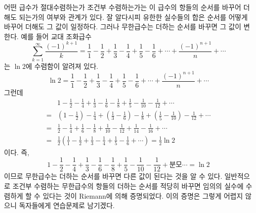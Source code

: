 \documentclass[11pt, a4paper]{book}
\begin{document}
 어떤 급수가 절대수렴하는가 조건부 수렴하는가는 이 급수의 항들의 순서를 바꾸어 더해도 되는가의 여부와 관계가 있다. 잘 알다시피 유한한 실수들의 합은 순서를 어떻게 바꾸어 더해도 그 값이 일정하다. 그러나 무한급수는 더하는 순서를 바꾸면 그 값이 변한다. 예를 들어 교대 조화급수
 \begin{equation*}
 	\sum_{k=1}^{\infty} \frac{(-1)^{k+1}}{k}=\frac{1}{1}-\frac{1}{2}+\frac{1}{3}-\frac{1}{4}+\frac{1}{5}-\frac{1}{6}+\cdots+\frac{(-1)^{n+1}}{n}+\cdots 
 \end{equation*}
는 $\ln 2$에 수렴함이 알려져 있다. 
\begin{equation*}
	\ln 2=\frac{1}{1}-\frac{1}{2}+\frac{1}{3}-\frac{1}{4}+\frac{1}{5}-\frac{1}{6}+\cdots+\frac{(-1)^{n+1}}{n}+\cdots 
\end{equation*}
그런데 
\begin{align*}
	&1-\frac{1}{2}-\frac{1}{4}+\frac{1}{3}-\frac{1}{6}-\frac{1}{8}+\frac{1}{5} -\frac{1}{10} -\frac{1}{12} + \cdots \\
	=& \left(1-\frac{1}{2}\right) -\frac{1}{4} +\left(\frac{1}{3}-\frac{1}{6}\right)-\frac{1}{8} +\left(\frac{1}{5} -\frac{1}{10}\right) -\frac{1}{12} + \cdots \\
	=& \frac{1}{2} -\frac{1}{4} +\frac{1}{6} -\frac{1}{8} + \frac{1}{10} -\frac{1}{12} +\frac{1}{14} - \frac{1}{16} + \cdots \\
	=& \frac{1}{2} \left( \frac{1}{1}-\frac{1}{2}+\frac{1}{3}-\frac{1}{4}+\frac{1}{5}-\frac{1}{6}+\cdots \right)  =\frac{1}{2} \ln 2
\end{align*}
이다. 즉,
\begin{equation*}
	1-\frac{1}{2}-\frac{1}{4}+\frac{1}{3}-\frac{1}{6}-\frac{1}{8}+\frac{1}{5} -\frac{1}{10} -\frac{1}{12} + {분모}\cdots =\ln 2
\end{equation*}
이므로 무한급수는 더하는 순서를 바꾸면 다른 값이 된다는 것을 알 수 있다. 일반적으로 조건부 수렴하는 무한급수의 항들의 더하는 순서를 적당히 바꾸면 임의의 실수에 수렴하게 할 수 있다는 것이 Riemann에 의해 증명되었다. 이의 증명은 그렇게 어렵지 않으니 독자들에게 연습문제로 남기겠다.
\end{document}
